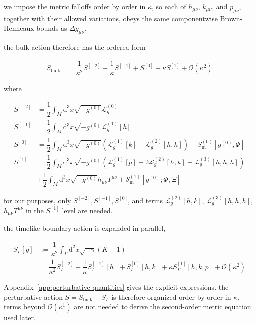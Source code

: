 we impose the metric falloffs order by order in $\displaystyle{\kappa}$, so each of $\displaystyle{h_{\mu \nu}}$, $\displaystyle{k_{\mu \nu}}$, and $\displaystyle{p_{\mu \nu}}$, together with their allowed variations, obeys the same componentwise Brown-Henneaux bounds as $\displaystyle{\Delta g_{\mu \nu}}$.

the bulk action therefore has the ordered form

\begin{align}
S_{\text{bulk}} & =\dfrac{1}{\kappa ^{2}}S^{[-2]}+\dfrac{1}{\kappa}S^{[-1]}+S^{[0]}+\kappa S^{[1]}+\mathcal{O}(\kappa ^{2})
\end{align}

where

\begin{align}
S^{[-2]} & =\dfrac{1}{2}\int _{M}\mathrm{d}^{3}x\sqrt{ -g^{(0)} }\mathcal{L}_{g}^{(0)} \\
S^{[-1]} & =\dfrac{1}{2}\int _{M}\mathrm{d}^{3}x\sqrt{ -g^{(0)} }\mathcal{L}_{g}^{(1)}[h] \\
S^{[0]} & =\dfrac{1}{2}\int _{M}\mathrm{d}^{3}x\sqrt{ -g^{(0)} }(\mathcal{L}_{g}^{(1)}[k]+\mathcal{L}_{g}^{(2)}[h,h])+S_{\mathrm{m}}^{(0)}[g^{(0)},\Phi] \\
S^{[1]} & =\dfrac{1}{2}\int _{M}\mathrm{d}^{3}x\sqrt{ -g^{(0)} }(\mathcal{L}_{g}^{(1)}[p]+2\mathcal{L}_{g}^{(2)}[h,k]+\mathcal{L}_{g}^{(3)}[h,h,h]) \\
 & +\dfrac{1}{2}\int _{M}\mathrm{d}^{3}x\sqrt{ -g^{(0)} }h_{\mu \nu}T^{\mu \nu}+S_{\mathrm{m}}^{(1)}[g^{(0)};\Phi,\Xi]
\end{align}

for our purposes, only $\displaystyle{S^{[-2]},S^{[-1]},S^{[0]}}$, and terms $\displaystyle{\mathcal{L}_{g}^{(2)}[h,k]}$, $\displaystyle{\mathcal{L}_{g}^{(3)}[h,h,h]}$, $\displaystyle{h_{\mu \nu}T^{\mu \nu}}$ in the $\displaystyle{S^{[1]}}$ level are needed.

the timelike-boundary action is expanded in parallel,

\begin{align}
S_{\Gamma}[g] & :=\dfrac{1}{\kappa ^{2}}\int _{\Gamma}\mathrm{d}^{2}x\sqrt{ -\gamma }(K-1) \\
 & =\dfrac{1}{\kappa ^{2}}S_{\Gamma}^{[-2]} +\dfrac{1}{\kappa}S_{\Gamma}^{[-1]}[h] +S_{\Gamma}^{[0]}[h,k] +\kappa S_{\Gamma}^{[1]}[h,k,p] +\mathcal{O}(\kappa ^{2})
\end{align}

Appendix~\ref{app:perturbative-quantities} gives the explicit expressions. the perturbative action $\displaystyle{S=S_{\text{bulk}}+S_{\Gamma}}$ is therefore organized order by order in $\displaystyle{\kappa}$. terms beyond $\displaystyle{\mathcal{O}(\kappa ^{1})}$ are not needed to derive the second-order metric equation used later.

